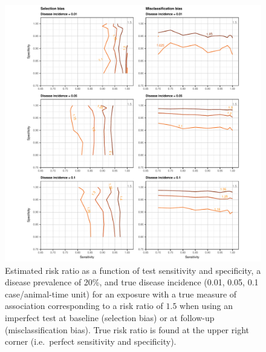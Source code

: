 \documentclass[utf8]{frontiers_suppmat} %
\begin{document}
\begin{figure}[htbp]
  \begin{center}
    \includegraphics[scale=.95]{master-risk15_20_contourX-1}
  \end{center}
  \caption{Estimated risk ratio as a function of test sensitivity and
    specificity, a disease prevalence of 20\%, and true disease incidence (0.01,
    0.05, 0.1 case/animal-time unit) for an exposure with a true measure of
    association corresponding to a risk ratio of \(1.5\) when using an imperfect
    test at baseline (selection bias) or at follow-up (misclassification bias).
    True risk ratio is found at the upper right corner (i.e.\ perfect
    sensitivity and specificity).}
  \label{fig:risk15_contourX20}
\end{figure}



%
\end{document}
